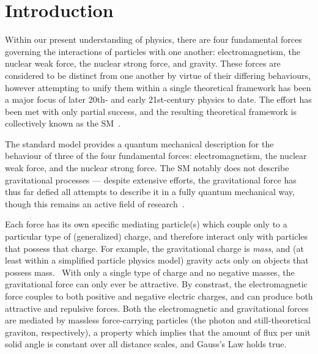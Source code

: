 \section{Introduction}
\label{section:intro}
Within our present understanding of physics, there are four fundamental forces governing the interactions of particles with one another:  electromagnetism, the nuclear weak force, the nuclear strong force, and gravity.  These forces are considered to be distinct from one another by virtue of their differing behaviours, however attempting to unify them within a single theoretical framework has been a major focus of later 20th- and early 21st-century physics to date.  The effort has been met with only partial success, and the resulting theoretical framework is collectively known as the \ac{SM}~\cite{griffiths_particles}.

The standard model provides a quantum mechanical description for
the behaviour of three of the four fundamental forces:  electromagnetism, the nuclear weak force, and the nuclear strong force.  The \ac{SM} notably does not describe gravitational processes --- despite extensive efforts, the gravitational force has thus far defied all attempts to describe it in a fully quantum mechanical way, though this remains an active field of research~\cite{peskinandschroeder}.  

%
Each force has its own specific mediating particle(s) which couple only to a particular type of (generalized) charge, and therefore interact only with particles that possess that charge.  For example, the gravitational charge is \emph{mass}, and (at least within a simplified particle physics model) gravity acts only on objects that possess mass.~  With only a single type of charge and no negative masses, the gravitational force can only ever be attractive.
%
By constrast, the electromagnetic force couples to both positive and negative electric charges, and can produce both attractive and repulsive forces.  Both the electromagnetic and gravitational forces are mediated by massless force-carrying particles (the photon and still-theoretical graviton, respectively), a property which implies that the amount of flux per unit solid angle is constant over all distance scales, and Gauss's Law holds true.

